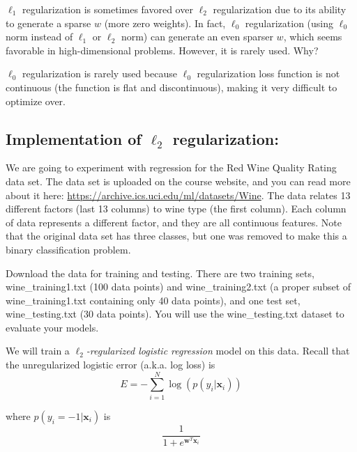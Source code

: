 \problem[4]
$\ell_1$ regularization is sometimes favored over $\ell_2$ regularization due to its ability to generate a sparse $w$ (more zero weights).
In fact, $\ell_0$ regularization (using $\ell_0$ norm instead of $\ell_1$ or $\ell_2$ norm) can generate an even sparser $w$, which seems favorable in high-dimensional problems.
However, it is rarely used.  Why?

$\ell_0$ regularization is rarely used because $\ell_0$ regularization loss function is not continuous (the function is flat and discontinuous), making it very difficult to optimize over.

\subsection{Implementation of \texorpdfstring{$\ell_2$}{L2} regularization:}

We are going to experiment with regression for the Red Wine Quality Rating data set. The data set is uploaded on the course website, and you can read more about it here: \url{https://archive.ics.uci.edu/ml/datasets/Wine}. The data relates 13 different factors (last 13 columns) to wine type (the first column). Each column of data represents a different factor, and they are all continuous features. Note that the original data set has three classes, but one was removed to make this a binary classification problem.

Download the data for training and testing.
There are two training sets, wine\_training1.txt (100 data points) and wine\_training2.txt (a proper subset of wine\_training1.txt containing only 40 data points), and one test set, wine\_testing.txt (30 data points). You will use the wine\_testing.txt dataset to evaluate your models.

We will train a \emph{$\ell_2$-regularized logistic regression} model on this data. Recall that the unregularized logistic error (a.k.a. log loss) is
\[E = -\sum_{i=1}^{N}\log(p(y_i | \mathbf{x}_i))\]

where $p(y_i = -1 | \mathbf{x}_i)$ is
\[\frac{1}{1 + e^{\mathbf{w}^T\mathbf{x}_i}}\]

